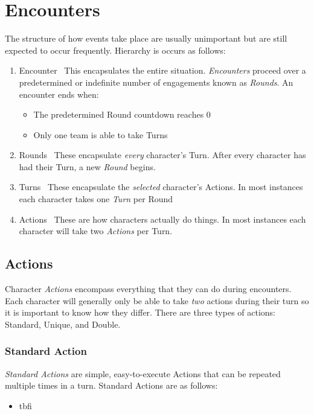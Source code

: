 \chapter{Encounters}\label{ch:encounter}
The structure of how events take place are usually unimportant but are still expected to occur frequently. Hierarchy is occurs as follows:
\begin{enumerate}
	\item {\large Encounter} \linebreak\
	This encapsulates the entire situation. \emph{Encounters} proceed over a predetermined or indefinite number of engagements known as \emph{Rounds}. An encounter ends when: 
	\begin{itemize}
		\item The predetermined Round countdown reaches 0
		\item Only one team is able to take Turns
	\end{itemize}
\item {\large Rounds} \linebreak\
	These encapsulate \emph{every} character's Turn. After every character has had their Turn, a new \emph{Round} begins.
\item {\large Turns}\index{Turn} \linebreak\
	These encapsulate the \emph{selected} character's Actions. In most instances each character takes one \emph{Turn} per Round
\item {\large Actions}\index{Action} \linebreak\
	These are how characters actually do things. In most instances each character will take two \emph{Actions} per Turn.
\end{enumerate}

\section{Actions}\label{sec:actions}
Character \emph{Actions} encompass everything that they can do during encounters. Each character will generally only be able to take \emph{two} actions during their turn so it is important to know how they differ. There are three types of actions: Standard, Unique, and Double.
\subsection{Standard Action}\label{subsec:act_standard}
\emph{Standard Actions} are simple, easy-to-execute Actions that can be repeated multiple times in a turn. Standard Actions are as follows:
\begin{itemize}
	\item tbfi
\end{itemize}

